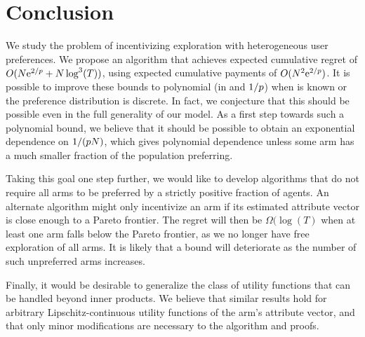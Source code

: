 \section{Conclusion}
We study the problem of incentivizing exploration with heterogeneous
user preferences.
We propose an algorithm that achieves expected cumulative regret of
$O(N \mathrm{e}^{2/p} + N \log^3(T))$,
using expected cumulative payments of $O(N^2 \mathrm{e}^{2/p})$.
It is possible to improve these bounds to polynomial (in \ARMNUM and
$1/p$) when \MinProb is known or the preference distribution is
discrete.
In fact, we conjecture that this should be possible even in the full
generality of our model.
As a first step towards such a polynomial bound, we believe that it
should be possible to obtain an exponential dependence on
$1/(p N)$, which gives polynomial dependence unless some
arm has a much smaller fraction of the population preferring.

Taking this goal one step further, we would like to 
develop algorithms that do not require all arms to be preferred by a
strictly positive fraction of agents.
An alternate algorithm might only incentivize an arm if its estimated
attribute vector is close enough to a Pareto frontier.
The regret will then be $\Omega(\log(T)$ when at least one arm falls
below the Pareto frontier, as we no longer have free exploration of
all arms. 
It is likely that a bound will deteriorate as the number of such
unpreferred arms increases.

Finally, it would be desirable to generalize the class of utility
functions that can be handled beyond inner products.
We believe that similar results hold for arbitrary
Lipschitz-continuous utility functions of the arm's attribute vector,
and that only minor modifications are necessary to the algorithm and
proofs.

